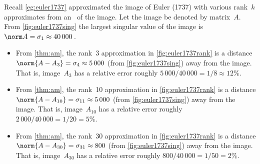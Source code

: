 \begin{example} \label{eg:}
Recall \autoref{eg:euler1737} approximated the image of Euler (1737) with various rank~\(k\) approximates from an \svd\ of the image.
Let the image be denoted by matrix~\(A\).
From \autoref{fig:euler1737sing} the largest singular value of the image is \(\norm A=\sigma_1\approx40\,000\)\,.
\begin{itemize}
\item From  \autoref{thm:am}, the rank~3 approximation in \autoref{fig:euler1737rank} is a distance \(\norm{A-A_3}=\sigma_4\approx 5\,000\) (from \autoref{fig:euler1737sing}) away from the image.  
That is, image~\(A_3\) has a relative error roughly \(5\,000/40\,000=1/8\approx 12\%\).
\item From  \autoref{thm:am}, the rank~10 approximation in \autoref{fig:euler1737rank} is a distance \(\norm{A-A_{10}}=\sigma_{11}\approx 5\,000\) (from \autoref{fig:euler1737sing}) away from the image.  
That is, image~\(A_{10}\) has a relative error roughly \(2\,000/40\,000=1/20= 5\%\). 
\item From  \autoref{thm:am}, the rank~30 approximation in \autoref{fig:euler1737rank} is a distance \(\norm{A-A_{30}}=\sigma_{31}\approx 800\) (from \autoref{fig:euler1737sing}) away from the image.  
That is, image~\(A_{30}\) has a relative error roughly \(800/40\,000=1/50= 2\%\). 
\end{itemize}
\end{example}


